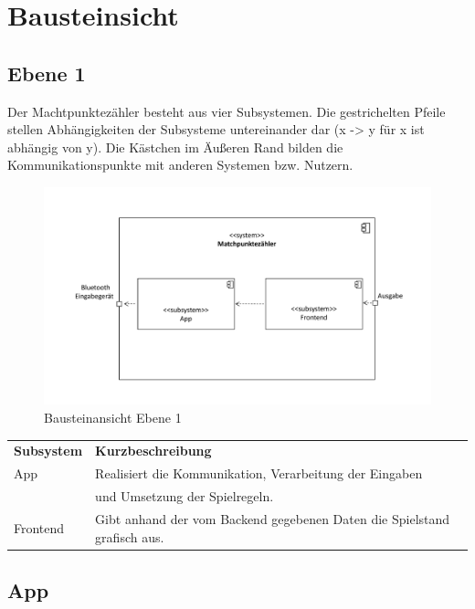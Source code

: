 \chapter{Bausteinsicht}

\section{Ebene 1}

Der Machtpunktezähler besteht aus vier Subsystemen. Die gestrichelten Pfeile stellen Abhängigkeiten der Subsysteme untereinander dar (x -> y für x ist abhängig von y). Die Kästchen im Äußeren Rand bilden die Kommunikationspunkte mit anderen Systemen bzw. Nutzern.

\begin{figure}[h]
\begin{center}
\includegraphics[scale=0.5]{Grafiken/Baustein_1.pdf}
\caption{Bausteinansicht Ebene 1}
\end{center}
\end{figure}

\begin{center}
\begin{tabular}[h]{|l|l|}
\cline{1-2}
\textbf{Subsystem} & \textbf{Kurzbeschreibung}\\
\cline{1-2}
App & Realisiert die Kommunikation, Verarbeitung der Eingaben\\&und Umsetzung der Spielregeln.\\ 
\cline{1-2}
Frontend & Gibt anhand der vom Backend gegebenen Daten die Spielstand grafisch aus.\\
\cline{1-2} 
\end{tabular}
\end{center}

\section{App}
